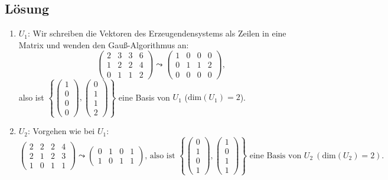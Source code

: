 \subsection{Lösung}
\begin{enumerate}
	\item \( U_1 \): Wir schreiben die Vektoren des Erzeugendensystems als Zeilen in eine Matrix und wenden den Gauß-Algorithmus an:
	\begin{equation*}
	 	\begin{pmatrix}
	 		2 & 3 & 3 & 6 \\
	 		1 & 2 & 2 & 4 \\
	 		0 & 1 & 1 & 2
	 	\end{pmatrix} \leadsto \begin{pmatrix}
	 		1 & 0 & 0 & 0 \\
	 		0 & 1 & 1 & 2 \\
	 		0 & 0 & 0 & 0 
	 	\end{pmatrix}\text{,}
	 \end{equation*} 
	 also ist \( \left\{ \begin{pmatrix}
	 	1 \\ 0 \\ 0 \\ 0
	 \end{pmatrix}, \begin{pmatrix}
	 	0 \\ 1 \\ 1 \\ 2
	 \end{pmatrix} \right\} \) eine Basis von \( U_1 \) (\( \text{dim}(U_1) = 2 \)).

	 \item \( U_2 \): Vorgehen wie bei \( U_1 \):
	 \begin{equation*}
	 	\begin{pmatrix}
	 		2 & 2 & 2 & 4 \\
	 		2 & 1 & 2 & 3 \\
	 		1 & 0 & 1 & 1
	 	\end{pmatrix} \leadsto \begin{pmatrix}
	 		0 & 1 & 0 & 1 \\
	 		1 & 0 & 1 & 1
	 	\end{pmatrix}\text{, also ist } \left\{ \begin{pmatrix}
	 	0 \\ 1 \\ 0 \\ 1
	 \end{pmatrix}, \begin{pmatrix}
	 	1 \\ 0 \\ 1 \\ 1
	 \end{pmatrix} \right\} \text{ eine Basis von } U_2 \ (\text{dim}(U_2) = 2)\text{.}
	 \end{equation*}


\end{enumerate}
